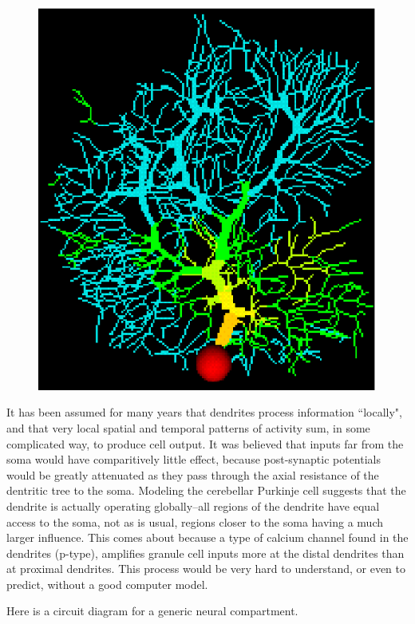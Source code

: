 \documentclass[12pt]{article}
\begin{document}
\begin{figure}[h]
  \centering
 \includegraphics[scale=0.5]{figures/colpurk.eps}
  \label{fig:colpurk}
\end{figure}

It has been assumed for many years that dendrites process information ``locally", and that very local spatial and temporal patterns of activity sum, in some complicated way, to produce cell output. It was believed that inputs far from the soma would have comparitively little effect, because post-synaptic potentials would be greatly attenuated as they pass through the axial resistance of the dentritic tree to the soma. Modeling the cerebellar Purkinje cell suggests that the dendrite is actually operating globally--all regions of the dendrite have equal access to the soma, not as is usual, regions closer to the soma having a much larger influence. This comes about because a type of calcium channel found in the dendrites (p-type), amplifies granule cell inputs more at the distal dendrites than at proximal dendrites. This process would be very hard to understand, or even to predict, without a good computer model.

Here is a circuit diagram for a generic neural compartment.
\end{document}
